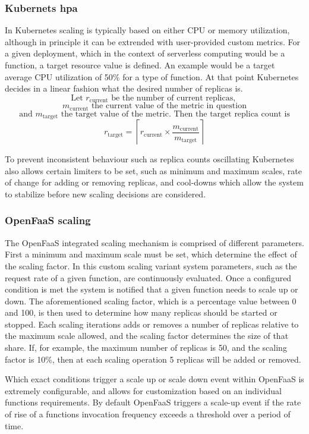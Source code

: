 \subsubsection{Kubernets \gls{hpa}}
In Kubernetes scaling is typically based on either CPU or memory utilization, although in principle it can be extrended with user-provided custom metrics\cite{kubernetes-hpa}.
For a given deployment, which in the context of serverless computing would be a function, a target resource value is defined.
An example would be a target average CPU utilization of 50\% for a type of function.
At that point Kubernetes decides in a linear fashion what the desired number of replicas is.
\[ \text{Let } r_{\text{current}} \text{ be the number of current replicas, }\]
\[m_{\text{current}} \text{ the current value of the metric in question}\]
\[\text{ and } m_{\text{target}} \text{ the target value of the metric. Then the target replica count is }\]
\[ r_{\text{target}} = \left \lceil r_{\text{current}} \times \frac{m_{\text{current}}}{m_{\text{target}}} \right \rceil\]

To prevent inconsistent behaviour such as replica counts oscillating Kubernetes also allows certain limiters to be set, such as minimum and maximum scales, rate of change for adding or removing replicas, and cool-downs which allow the system to stabilize before new scaling decisions are considered\cite{kubernetes-hpa}.

\subsubsection{OpenFaaS scaling}
The OpenFaaS integrated scaling mechanism is comprised of different parameters.
First a minimum and maximum scale must be set, which determine the effect of the scaling factor.
In this custom scaling variant system parameters, such as the request rate of a given function, are continuously evaluated.
Once a configured condition is met the system is notified that a given function needs to scale up or down.
The aforementioned scaling factor, which is a percentage value between 0 and 100, is then used to determine how many replicas should be started or stopped\cite{openfaas-autoscaling}.
Each scaling iterations adds or removes a number of replicas relative to the maximum scale allowed, and the scaling factor determines the size of that share.
If, for example, the maximum number of replicas is 50, and the scaling factor is 10\%, then at each scaling operation 5 replicas will be added or removed.

Which exact conditions trigger a scale up or scale down event within OpenFaaS is extremely configurable, and allows for customization based on an individual functions requirements.
By default OpenFaaS triggers a scale-up event if the rate of rise of a functions invocation frequency exceeds a threshold over a period of time.




